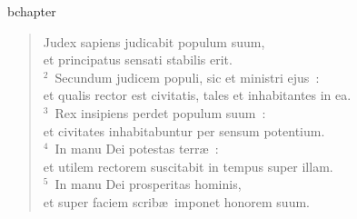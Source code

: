 bchapter\begin{verse}\vspace{-19pt}Judex sapiens judicabit populum suum,\\ et principatus sensati stabilis erit.\\
${}^{2}$~Secundum judicem populi, sic et ministri ejus~:\\ et qualis rector est civitatis, tales et inhabitantes in ea.\\
${}^{3}$~Rex insipiens perdet populum suum~:\\ et civitates inhabitabuntur per sensum potentium.\\
${}^{4}$~In manu Dei potestas terr\ae~:\\ et utilem rectorem suscitabit in tempus super illam.\\
${}^{5}$~In manu Dei prosperitas hominis,\\ et super faciem scrib\ae\ imponet honorem suum.\end{verse}


